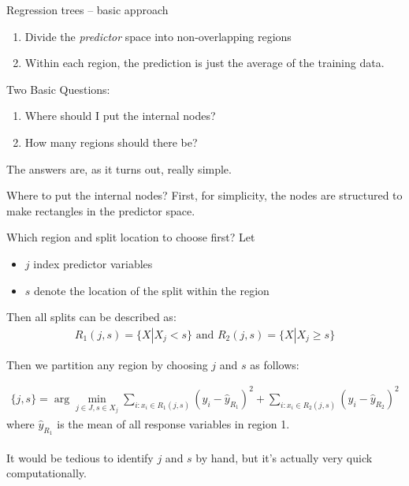 \documentclass[mathserif, aspectratio=169]{beamer}
\begin{document}
\begin{frame}{Regression trees -- basic approach}

\begin{enumerate}
\item Divide the \textit{predictor} space into non-overlapping regions
\item Within each region, the prediction is just the average of the training data.
\end{enumerate}

\pause

Two Basic Questions:

\begin{enumerate}
\item Where should I put the internal nodes?
\item How many regions should there be?
\end{enumerate}

The answers are, as it turns out, really simple.  

\end{frame}

\begin{frame}{Where to put the internal nodes?}
First, for simplicity, the nodes are structured to make rectangles in the predictor space.  

\end{frame}

\begin{frame}{Which region and split location to choose first?}
Let 
\begin{itemize}
\item $j$ index predictor variables
\item $s$ denote the location of the split within the region
\end{itemize}
Then all splits can be described as:
\begin{align*}
R_1(j,s) = \{X|X_j<s\} \text{ and } R_2(j,s) = \{X|X_j\ge s\} 
\end{align*}

Then we partition any region by choosing $j$ and $s$ as follows:

\begin{align*}
\{j,s\} = \arg \min_{j\in J, s\in X_j} \sum_{i:x_i\in R_1(j,s)} (y_i-\hat{y}_{R_1})^2 + \sum_{i:x_i\in R_2(j,s)} (y_i-\hat{y}_{R_2})^2
\end{align*}
where $\hat{y}_{R_1}$ is the mean of all response variables in region 1.  \\~\\

It would be tedious to identify $j$ and $s$ by hand, but it's actually very quick computationally.  
\end{frame}
\end{document}
